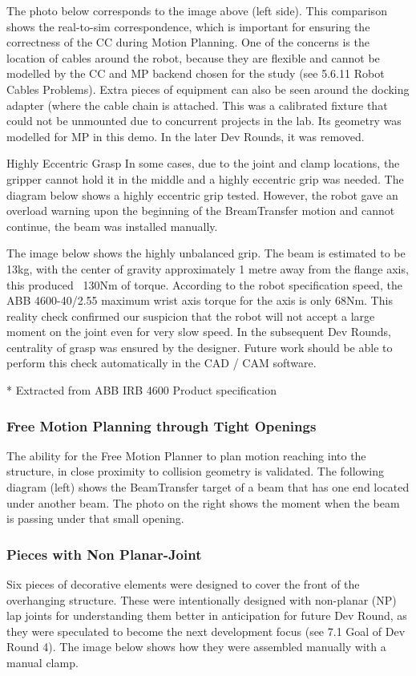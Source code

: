 \begin{itemize}
\begin{enumerate}
\begin{enumerate}
The photo below corresponds to the image above (left side). This comparison shows the real-to-sim correspondence, which is important for ensuring the correctness of the CC during Motion Planning. One of the concerns is the location of cables around the robot, because they are flexible and cannot be modelled by the CC and MP backend chosen for the study (see 5.6.11 Robot Cables Problems).
Extra pieces of equipment can also be seen around the docking adapter (where the cable chain is attached. This was a calibrated fixture that could not be unmounted due to concurrent projects in the lab. Its geometry was modelled for MP in this demo. In the later Dev Rounds, it was removed.


Highly Eccentric Grasp 
In some cases, due to the joint and clamp locations, the gripper cannot hold it in the middle and a highly eccentric grip was needed. The diagram below shows a highly eccentric grip tested. However, the robot gave an overload warning upon the beginning of the BreamTransfer motion and cannot continue, the beam was installed manually. 

The image below shows the highly unbalanced grip. The beam is estimated to be 13kg, with the center of gravity approximately 1 metre away from the flange axis, this produced ~130Nm of torque. According to the robot specification speed, the ABB 4600-40/2.55 maximum wrist axis torque for the axis is only 68Nm. This reality check confirmed our suspicion that the robot will not accept a large moment on the joint even for very slow speed. In the subsequent Dev Rounds, centrality of grasp was ensured by the designer. Future work should be able to perform this check automatically in the CAD / CAM software.


* Extracted from ABB IRB 4600 Product specification 
\subsubsection{Free Motion Planning through Tight Openings}
The ability for the Free Motion Planner to plan motion reaching into the structure, in close proximity to collision geometry is validated. The following diagram (left) shows the BeamTransfer target of a beam that has one end located under another beam. The photo on the right shows the moment when the beam is passing under that small opening. 


\subsubsection{Pieces with Non Planar-Joint}
Six pieces of decorative elements were designed to cover the front of the overhanging structure. These were intentionally designed with non-planar (NP) lap joints for understanding them better in anticipation for future Dev Round, as they were speculated to become the next development focus (see 7.1 Goal of Dev Round 4). The image below shows how they were assembled manually with a manual clamp. 


\end{enumerate}
\end{enumerate}
\end{itemize}
